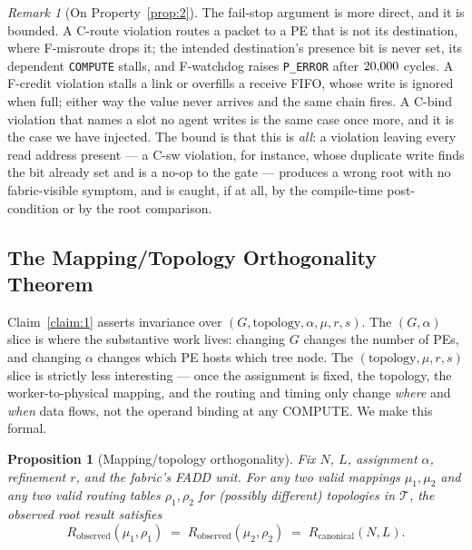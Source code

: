 \documentclass[journal,10pt]{IEEEtran}
\theoremstyle{plain}
\newtheorem{proposition}{Proposition}
\theoremstyle{definition}
\theoremstyle{remark}
\newtheorem*{remark}{Remark}
\newcommand{\Rcan}{\ensuremath{R_{\mathrm{canonical}}}}
\newcommand{\T}{\ensuremath{\mathcal{T}}}
\newcommand{\asgn}{\ensuremath{\alpha}}
\newcommand{\map}{\ensuremath{\mu}}
\begin{document}
\begin{remark}[On Property~\ref{prop:2}]
The fail-stop argument is more direct, and it is bounded. A
\textsf{C-route} violation routes a packet to a PE that is not its
destination, where \textsf{F-misroute} drops it; the intended
destination's presence bit is never set, its dependent \texttt{COMPUTE}
stalls, and \textsf{F-watchdog} raises \texttt{P\_ERROR} after
$20{,}000$ cycles. A \textsf{F-credit} violation stalls a link or
overfills a receive FIFO, whose write is ignored when full; either way the
value never arrives and the same chain fires. A \textsf{C-bind} violation
that names a slot no agent writes is the same case once more, and it is
the case we have injected. The bound is that this is \emph{all}: a
violation leaving every read address present --- a \textsf{C-sw}
violation, for instance, whose duplicate write finds the bit already set
and is a no-op to the gate --- produces a wrong root with no
fabric-visible symptom, and is caught, if at all, by the compile-time
post-condition or by the root comparison.
\end{remark}

\subsection{The Mapping/Topology Orthogonality Theorem}\label{sec:abi-orth}

Claim~\ref{claim:1} asserts invariance over $(G,\text{topology}, \asgn,
\map, r, s)$. The $(G, \asgn)$ slice is where the substantive work lives:
changing $G$ changes the number of PEs, and changing $\asgn$ changes
which PE hosts which tree node. The $(\text{topology}, \map, r, s)$
slice is strictly less interesting --- once the assignment is fixed, the
topology, the worker-to-physical mapping, and the routing and timing
only change \emph{where} and \emph{when} data flows, not the operand
binding at any COMPUTE. We make this formal.

\begin{proposition}[Mapping/topology orthogonality]\label{thm:orth}
Fix $N$, $L$, assignment $\asgn$, refinement $r$, and the fabric's FADD
unit. For any two valid mappings $\map_1, \map_2$ and any two valid
routing tables $\rho_1, \rho_2$ for (possibly different) topologies in
$\T$, the observed root result satisfies
\begin{equation}
  R_\mathrm{observed}(\map_1, \rho_1) \;=\; R_\mathrm{observed}(\map_2, \rho_2)
  \;=\; \Rcan(N, L).
\end{equation}
\end{proposition}
\end{document}
